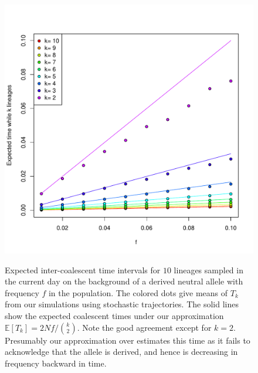 \documentclass[a4paper,10pt]{article}
\begin{document}
\begin{figure}
	\includegraphics[width = \textwidth]{../Paper_Figures/mean_coal_times_derived.pdf} \label{mean_coal_times_supp_plot}
\caption{Expected inter-coalescent time intervals for $10$ lineages sampled in the current day on the background of a derived neutral allele with frequency $f$ in the population. 
The colored dots give means of $T_k$ from our simulations using stochastic trajectories. The solid lines show the expected coalescent times 
under our approximation $ \mathbb{E} [T_k] = 2Nf/{k \choose 2}$. Note the good agreement except for $k=2$. Presumably our approximation over estimates this time as it fails to acknowledge that the allele is derived, and hence is decreasing in frequency backward in time. }
\label{mean_coal_times_supp_plot}
\end{figure} %
\end{document}
